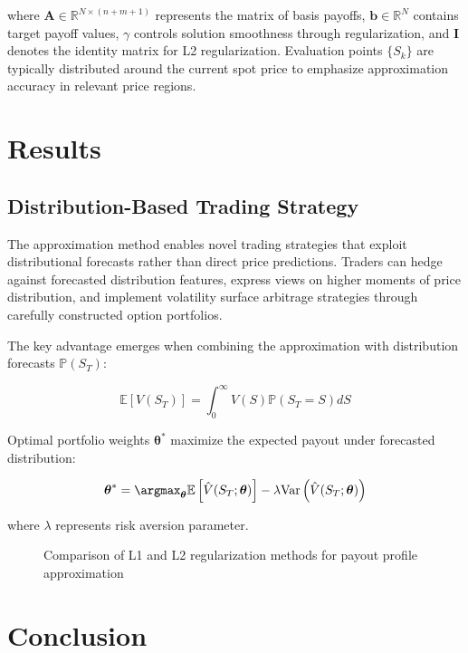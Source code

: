 \documentclass[12pt]{article}
\begin{document}
where $\mathbf{A} \in \mathbb{R}^{N \times (n+m+1)}$ represents the matrix of basis payoffs, $\mathbf{b} \in \mathbb{R}^N$ contains target payoff values, $\gamma$ controls solution smoothness through regularization, and $\mathbf{I}$ denotes the identity matrix for L2 regularization. Evaluation points $\{S_k\}$ are typically distributed around the current spot price to emphasize approximation accuracy in relevant price regions.

\section{Results}
\subsection{Distribution-Based Trading Strategy}
The approximation method enables novel trading strategies that exploit distributional forecasts rather than direct price predictions. Traders can hedge against forecasted distribution features, express views on higher moments of price distribution, and implement volatility surface arbitrage strategies through carefully constructed option portfolios.

The key advantage emerges when combining the approximation with distribution forecasts $\mathbb{P}(S_T)$:
 
\begin{equation}
\mathbb{E}[V(S_T)] = \int_{0}^{\infty} V(S) \mathbb{P}(S_T = S) dS
\end{equation}

Optimal portfolio weights $\boldsymbol{\theta}^*$ maximize the expected payout under forecasted distribution:

\begin{equation}
\boldsymbol{\theta}^* = \argmax_{\boldsymbol{\theta}} \mathbb{E}\left[\hat{V}(S_T;\boldsymbol{\theta})\right] - \lambda \text{Var}\left(\hat{V}(S_T;\boldsymbol{\theta})\right)
\end{equation}

where $\lambda$ represents risk aversion parameter.

\begin{figure}[htbp]
\centering

\caption{Comparison of L1 and L2 regularization methods for payout profile approximation}
\label{fig:regularization}
\end{figure}

\section{Conclusion}



\end{document}
